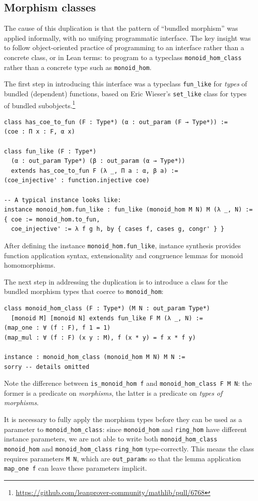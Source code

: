\documentclass[a4paper,UKenglish,cleveref, autoref, thm-restate]{lipics-v2021}
\begin{document}
\subsection{Morphism classes}
The cause of this duplication is that the pattern of ``bundled morphism'' was applied informally,
with no unifying programmatic interface.
The key insight was to follow object-oriented practice of programming to an interface rather than a concrete class, or in Lean terms:
to program to a typeclass \lstinline{monoid_hom_class} rather than a concrete type such as \lstinline{monoid_hom}.

The first step in introducing this interface was a typeclass \lstinline{fun_like} for \emph{types} of bundled (dependent) functions,
based on Eric Wieser's \lstinline{set_like} class for types of bundled subobjects.\footnote{\url{https://github.com/leanprover-community/mathlib/pull/6768}}
\begin{lstlisting}
class has_coe_to_fun (F : Type*) (α : out_param (F → Type*)) :=
(coe : Π x : F, α x)

class fun_like (F : Type*)
  (α : out_param Type*) (β : out_param (α → Type*))
  extends has_coe_to_fun F (λ _, Π a : α, β a) :=
(coe_injective' : function.injective coe)

-- A typical instance looks like:
instance monoid_hom.fun_like : fun_like (monoid_hom M N) M (λ _, N) :=
{ coe := monoid_hom.to_fun,
  coe_injective' := λ f g h, by { cases f, cases g, congr' } }
\end{lstlisting}
After defining the instance \lstinline{monoid_hom.fun_like},
instance synthesis provides function application syntax, extensionality and congruence lemmas for monoid homomorphisms.

The next step in addressing the duplication is to introduce a class for
the bundled morphism types that coerce to \lstinline{monoid_hom}:
\begin{lstlisting}
class monoid_hom_class (F : Type*) (M N : out_param Type*)
  [monoid M] [monoid N] extends fun_like F M (λ _, N) :=
(map_one : ∀ (f : F), f 1 = 1)
(map_mul : ∀ (f : F) (x y : M), f (x * y) = f x * f y)

instance : monoid_hom_class (monoid_hom M N) M N :=
sorry -- details omitted
\end{lstlisting}
Note the difference between \lstinline{is_monoid_hom f} and \lstinline{monoid_hom_class F M N}:
the former is a predicate on \emph{morphisms}, the latter is a predicate on \emph{types of morphisms}.

It is necessary to fully apply the morphism types before they can be used as a parameter to \lstinline{monoid_hom_class}:
since \lstinline{monoid_hom} and \lstinline{ring_hom} have different instance parameters,
we are not able to write both \lstinline{monoid_hom_class monoid_hom} and \lstinline{monoid_hom_class} \lstinline{ring_hom} type-correctly.
This means the class requires parameters \lstinline{M N}, which are \lstinline{out_param}s so that the lemma application \lstinline{map_one f} can leave these parameters implicit.
\end{document}
